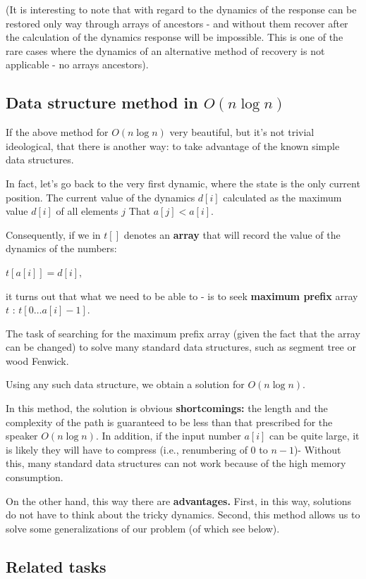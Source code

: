 (It is interesting to note that with regard to the dynamics of the response can be restored only way through arrays of ancestors - and without them recover after the calculation of the dynamics response will be impossible. This is one of the rare cases where the dynamics of an alternative method of recovery is not applicable - no arrays ancestors).

\subsection{ Data structure method in $O (n \log n)$  }

If the above method for $O (n \log n)$ very beautiful, but it's not trivial ideological, that there is another way: to take advantage of the known simple data structures.

In fact, let's go back to the very first dynamic, where the state is the only current position. The current value of the dynamics $d [i]$ calculated as the maximum value $d [i]$ of all elements $j$ That $a [j] <a [i]$.

Consequently, if we in $t []$ denotes an \textbf{array} that will record the value of the dynamics of the numbers:

$t [a [i]] = d [i],$

it turns out that what we need to be able to - is to seek \textbf{maximum prefix} array $t$ : $t [0 \ldots a [i] -1]$.

The task of searching for the maximum prefix array (given the fact that the array can be changed) to solve many standard data structures, such as segment tree or wood Fenwick.

Using any such data structure, we obtain a solution for $O (n \log n)$.

In this method, the solution is obvious \textbf{shortcomings:} the length and the complexity of the path is guaranteed to be less than that prescribed for the speaker $O (n \log n)$. In addition, if the input number $a [i]$ can be quite large, it is likely they will have to compress (i.e., renumbering of $0$ to $n-1$)- Without this, many standard data structures can not work because of the high memory consumption.

On the other hand, this way there are \textbf{advantages.} First, in this way, solutions do not have to think about the tricky dynamics. Second, this method allows us to solve some generalizations of our problem (of which see below).

\subsection{ Related tasks }

